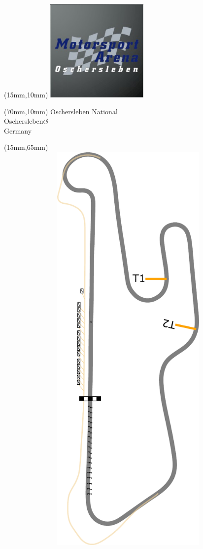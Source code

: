 \null\newpage
\begin{textblock*}{50mm}(15mm,10mm)%
\includegraphics[width=50mm]{LG/2015-05-20_00090.png}
\end{textblock*}
\begin{textblock*}{130mm}(70mm,10mm)%
{\fontsize{20}{20}\selectfont Oschersleben National\\}
{\fontsize{16}{16}\selectfont Oschersleben\hfill \huge$\circlearrowleft$\\}
{\fontsize{12}{12}\selectfont Germany\\}
\end{textblock*}
\begin{textblock*}{185mm}(15mm,65mm)%
\centering
\mbox{\includegraphics[width=185mm,height=210mm,keepaspectratio]{PT/OSNA.pdf}}
\end{textblock*}
